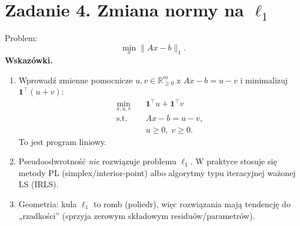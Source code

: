 \documentclass[12pt,a4paper]{article}
\begin{document}
\section*{Zadanie 4. Zmiana normy na $\ell_1$}
Problem:
\[
\min_x \|Ax-b\|_1.
\]
\textbf{Wskazówki.}
\begin{enumerate}
  \item Wprowadź zmienne pomocnicze $u,v\in\mathbb{R}^m_{\ge 0}$ z $Ax-b=u-v$ i minimalizuj $\mathbf{1}^\top(u+v)$:
  \[
  \begin{aligned}
  \min_{x,u,v}\quad & \mathbf{1}^\top u+\mathbf{1}^\top v\\
  \text{s.t.}\quad & Ax-b=u-v,\\
  & u\ge 0,\; v\ge 0.
  \end{aligned}
  \]
  To jest program liniowy.
  \item Pseudoodwrotność \emph{nie} rozwiązuje problemu $\ell_1$.  
  W praktyce stosuje się metody PL (simplex/interior-point) albo algorytmy typu iteracyjnej ważonej LS (IRLS).
  \item Geometria: kula $\ell_1$ to romb (poliedr), więc rozwiązania mają tendencję do „rzadkości” (sprzyja zerowym składowym residuów/parametrów).
\end{enumerate}
\end{document}
